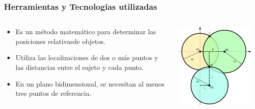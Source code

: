 \begin{frame}
	\frametitle{Herramientas y Tecnologías utilizadas}
	\begin{columns}
			\begin{column}{0.6\textwidth}
					\begin{itemize}
						\item {Es un método matemático para determinar las posiciones relativasde objetos.}
						\item {Utiliza las localizaciones de dos o más puntos y las distancias entre el sujeto y cada punto.}
						\item {En un plano bidimensional, se necesitan al menos tres puntos de referencia.}
					\end{itemize}
				\endblock{}
			\end{column}
			\begin{column}{0.4\textwidth}
				\vfill 
					\begin{center}
						\includegraphics[width=0.8\linewidth]{Images/trilateration}
					\end{center}
			\end{column}
	\end{columns}
\end{frame}

